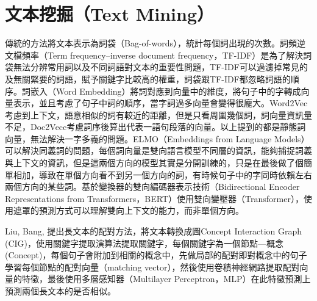 \section{文本挖掘（Text Mining）}

傳統的方法將文本表示為詞袋（Bag-of-words），統計每個詞出現的次數。詞頻逆文檔頻率（Term frequency–inverse document frequency，TF-IDF）是為了解決詞袋無法分辨常用詞以及不同詞語對文本的重要性問題，TF-IDF可以過濾掉常見的及無關緊要的詞語，賦予關鍵字比較高的權重，詞袋跟TF-IDF都忽略詞語的順序。詞嵌入（Word Embedding）將詞對應到向量中的維度，將句子中的字轉成向量表示，並且考慮了句子中詞的順序，當字詞過多向量會變得很龐大。Word2Vec考慮到上下文，語意相似的詞有較近的距離，但是只看周圍幾個詞，詞向量資訊量不足，Doc2Vecc考慮詞序後算出代表一語句段落的向量。以上提到的都是靜態詞向量，無法解決一字多義的問題。ELMO（Embeddings from Language Models）可以解決同義詞的問題，每個詞向量是雙向語言模型不同層的資訊，能夠捕捉詞義與上下文的資訊，但是這兩個方向的模型其實是分開訓練的，只是在最後做了個簡單相加，導致在單個方向看不到另一個方向的詞，有時候句子中的字同時依賴左右兩個方向的某些詞。基於變換器的雙向編碼器表示技術（Bidirectional Encoder Representations from Transformers，BERT）使用雙向變壓器（Transformer），使用遮罩的預測方式可以理解雙向上下文的能力，而非單個方向。

Liu, Bang, \etal \cite{CIGmatching} 提出長文本的配對方法，將文本轉換成圖Concept Interaction Graph (CIG)，使用關鍵字提取演算法提取關鍵字，每個關鍵字為一個節點—概念(Concept)，每個句子會附加到相關的概念中，先做局部的配對即對概念中的句子學習每個節點的配對向量（matching vector），然後使用卷積神經網路提取配對向量的特徵，最後使用多層感知器（Multilayer Perceptron，MLP）在此特徵預測上預測兩個長文本的是否相似。

